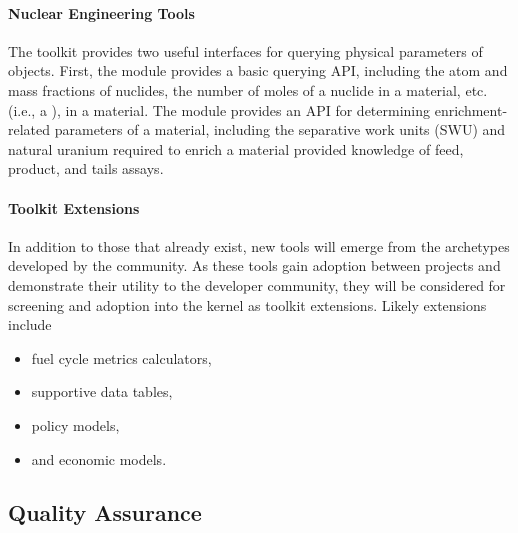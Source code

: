 \paragraph{Nuclear Engineering Tools}

The \Cyclus toolkit provides two useful interfaces for querying physical parameters of 
objects. First, the  module
provides a basic querying \gls{API}, including the atom and mass fractions of
nuclides, the number of moles of a nuclide in a material, etc. (i.e., a
), in a material. The
 module provides an \gls{API} for determining enrichment-related
parameters of a material, including the separative work units (SWU) and natural
uranium required to enrich a material provided knowledge of feed, product, and tails
assays.

\paragraph{Toolkit Extensions}

In addition to those that already exist, new tools will
emerge from the archetypes developed by the community. As these tools gain adoption between projects and demonstrate their
utility to the developer community, they will be considered for screening and
adoption into the kernel as toolkit extensions. Likely extensions include

\begin{itemize}
\item fuel cycle metrics calculators,
\item supportive data tables,
\item policy models,
\item and economic models.
\end{itemize}

\subsection{Quality Assurance}
%

%

